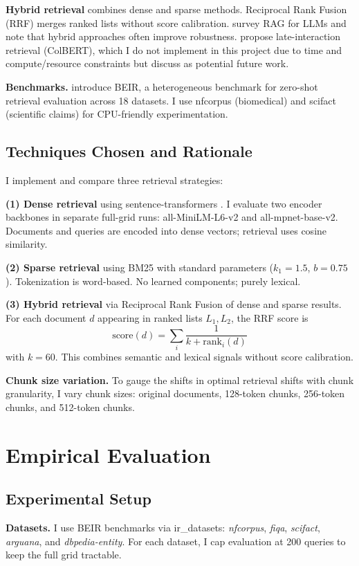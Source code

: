 \documentclass[twoside, 11pt]{article}
\begin{document}
\textbf{Hybrid retrieval} combines dense and sparse methods. Reciprocal Rank Fusion (RRF) merges ranked lists without score calibration. \citet{gao2022rag} survey RAG for LLMs and note that hybrid approaches often improve robustness. \citet{khattab2020colbert} propose late-interaction retrieval (ColBERT), which I do not implement in this project due to time and compute/resource constraints but discuss as potential future work.

\textbf{Benchmarks.} \citet{thakur2021beir} introduce BEIR, a heterogeneous benchmark for zero-shot retrieval evaluation across 18 datasets. I use nfcorpus (biomedical) and scifact (scientific claims) for CPU-friendly experimentation.

\subsection{Techniques Chosen and Rationale}
I implement and compare three retrieval strategies:

\textbf{(1) Dense retrieval} using sentence-transformers \citep{reimers2019sentencebert}. I evaluate two encoder backbones in separate full-grid runs: all-MiniLM-L6-v2 and all-mpnet-base-v2. Documents and queries are encoded into dense vectors; retrieval uses cosine similarity.

\textbf{(2) Sparse retrieval} using BM25 with standard parameters ($k_1 = 1.5$, $b = 0.75$). Tokenization is word-based. No learned components; purely lexical.

\textbf{(3) Hybrid retrieval} via Reciprocal Rank Fusion of dense and sparse results. For each document $d$ appearing in ranked lists $L_1, L_2$, the RRF score is
$$
\text{score}(d) = \sum_{i} \frac{1}{k + \text{rank}_i(d)}
$$
with $k = 60$. This combines semantic and lexical signals without score calibration.

\textbf{Chunk size variation.} To gauge the shifts in optimal retrieval shifts with chunk granularity, I vary chunk sizes: original documents, 128-token chunks, 256-token chunks, and 512-token chunks.

\section{Empirical Evaluation}
\subsection{Experimental Setup}
\textbf{Datasets.} I use BEIR benchmarks via ir\_datasets: \textit{nfcorpus}, \textit{fiqa}, \textit{scifact}, \textit{arguana}, and \textit{dbpedia-entity}. For each dataset, I cap evaluation at 200 queries to keep the full grid tractable.
\end{document}
